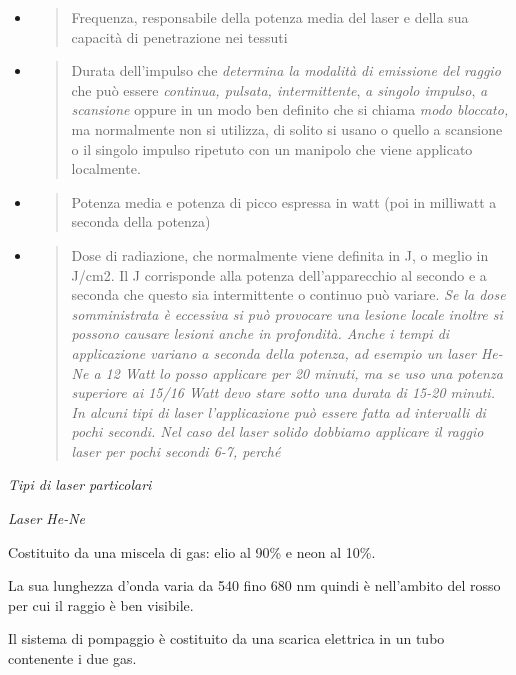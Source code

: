 \documentclass[]{article}
\begin{document}
\begin{itemize}
\item
  \begin{quote}
  Frequenza, responsabile della potenza media del laser e della sua
  capacità di penetrazione nei tessuti
  \end{quote}
\item
  \begin{quote}
  Durata dell'impulso che \emph{determina la modalità di emissione del
  raggio} che può essere \emph{continua, pulsata, intermittente},
  \emph{a singolo impulso}, \emph{a scansione} oppure in un modo ben
  definito che si chiama \emph{modo bloccato,} ma normalmente non si
  utilizza, di solito si usano o quello a scansione o il singolo impulso
  ripetuto con un manipolo che viene applicato localmente.
  \end{quote}
\item
  \begin{quote}
  Potenza media e potenza di picco espressa in watt (poi in milliwatt a
  seconda della potenza)
  \end{quote}
\item
  \begin{quote}
  Dose di radiazione, che normalmente viene definita in J, o meglio in
  J/cm2. Il J corrisponde alla potenza dell'apparecchio al secondo e a
  seconda che questo sia intermittente o continuo può variare. \emph{Se
  la dose somministrata è eccessiva si può provocare una lesione locale
  inoltre si possono causare lesioni anche in profondità. Anche i tempi
  di applicazione variano a seconda della potenza, ad esempio un laser
  He-Ne a 12 Watt lo posso applicare per 20 minuti, ma se uso una
  potenza superiore ai 15/16 Watt devo stare sotto una durata di 15-20
  minuti. In alcuni tipi di laser l'applicazione può essere fatta ad
  intervalli di pochi secondi. Nel caso del laser solido dobbiamo
  applicare il raggio laser per pochi secondi 6-7, perché }
  \end{quote}
\end{itemize}

\emph{Tipi di laser particolari}

\emph{Laser He-Ne}

Costituito da una miscela di gas: elio al 90\% e neon al 10\%.

La sua lunghezza d'onda varia da 540 fino 680 nm quindi è nell'ambito
del rosso per cui il raggio è ben visibile.

Il sistema di pompaggio è costituito da una scarica elettrica in un tubo
contenente i due gas.
\end{document}
